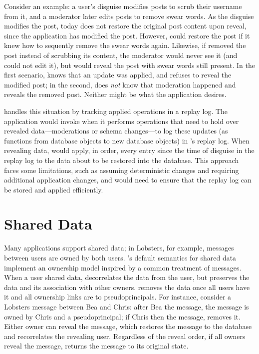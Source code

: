 Consider an example: a user's disguise modifies posts to scrub their username
from it, and a moderator later edits posts to remove swear words.
%
As the disguise modifies the post, \sys today does not restore the
original post content upon reveal, since the application has modified the post.
%
However, \sys could restore the post if it knew how to sequently remove the
swear words again.
%
Likewise, if \sys removed the post instead of scrubbing its content, the
moderator would never see it (and could not edit it), but \sys would reveal the
post with swear words still present.
%
In the first scenario, \sys knows that an update was applied, and refuses to
reveal the modified post; in the second, \sys does \emph{not} know that
moderation happened and reveals the removed post.
%
Neither might be what the application desires.
%

\sys handles this situation by tracking applied operations in a replay log.
%
The application would invoke \sys when it performs operations that need to hold
over revealed data---\eg moderations or schema changes---to log these updates
(as functions from database objects to new database objects) in \sys's replay log.
%
When revealing data, \sys would apply, in order, every entry since the time of disguise 
in the replay log to the data about to be restored into the database.
%
This approach faces some limitations, such as assuming deterministic changes
and requiring additional application changes, and would need to ensure that
the replay log can be stored and applied efficiently.
%



\section{Shared Data}
\label{s:shared}
%
Many applications support shared data; in Lobsters, for example, messages
between users are owned by both users.
%
\sys's default semantics for shared data implement an ownership model inspired
by a common treatment of messages.
%
When a user \xxs shared data, \sys decorrelates the data from the \xxing user,
but preserves the data and its association with other owners.
%
\sys removes the data once all users have \xxed it and all ownership links are
to pseudoprincipals.
%
For instance, consider a Lobsters message between Bea and Chris: after Bea \xxs
the message, the message is owned by Chris and a pseudoprincipal; if Chris then
\xxs the message, \sys removes it.
%
Either owner can reveal the message, which restores the message to the database
and recorrelates the revealing user.
%
Regardless of the reveal order, if all owners reveal the message, \sys returns
the message to its original state.
%

